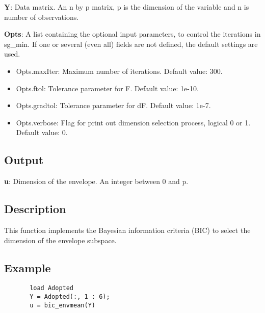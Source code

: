 \documentclass[a4paper,11pt,openany]{memoir}
\begin{document}
\begin{par}
\textbf{Y}: Data matrix. An n by p matrix, p is the dimension of the variable and n is number of observations.
\end{par} \vspace{1em}
\begin{par}
\textbf{Opts}: A list containing the optional input parameters, to control the iterations in sg\_min. If one or several (even all) fields are not defined, the default settings are used.
\end{par} \vspace{1em}
\begin{itemize}
\setlength{\itemsep}{-1ex}
   \item Opts.maxIter: Maximum number of iterations.  Default value: 300.
   \item Opts.ftol: Tolerance parameter for F.  Default value: 1e-10.
   \item Opts.gradtol: Tolerance parameter for dF.  Default value: 1e-7.
   \item Opts.verbose: Flag for print out dimension selection process, logical 0 or 1. Default value: 0.
\end{itemize}


\subsection*{Output}

\begin{par}
\textbf{u}: Dimension of the envelope. An integer between 0 and p.
\end{par} \vspace{1em}


\subsection*{Description}

\begin{par}
This function implements the Bayesian information criteria (BIC) to select the dimension of the envelope subspace.
\end{par} \vspace{1em}


\subsection*{Example}


\begin{verbatim}       load Adopted
       Y = Adopted(:, 1 : 6);
       u = bic_envmean(Y)\end{verbatim}
    
\end{document}
